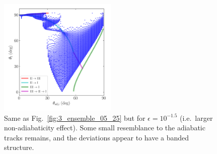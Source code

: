 \documentclass[
        fleqn,
        usenatbib,
    ]{mnras}
\begin{document}
\begin{figure}
    \centering
    \includegraphics[width=0.5\textwidth]{plots_diskdisp/3_ensemble_05_15.png}
    \caption{Same as Fig.~\ref{fig:3_ensemble_05_25} but for $\epsilon =
    10^{-1.5}$ (i.e.\ larger non-adiabaticity effect). Some small resemblance to
    the adiabatic tracks remains, and the deviations appear to have a banded
    structure. }\label{fig:3_ensemble_05_15}
\end{figure}
\end{document}
